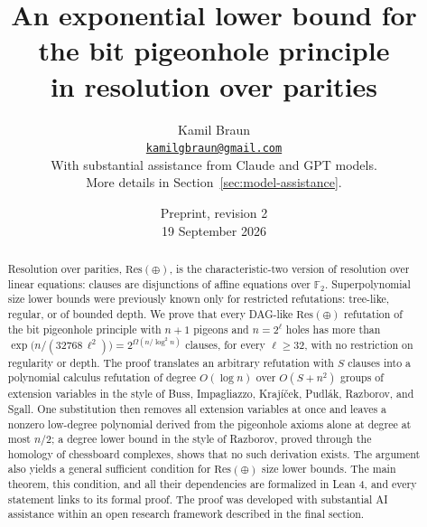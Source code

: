 \documentclass[11pt]{article}
\title{An exponential lower bound for the bit pigeonhole principle\\
in resolution over parities}
\author{Kamil Braun\\
\href{mailto:kamilgbraun@gmail.com}{\texttt{kamilgbraun@gmail.com}}\\[0.6em]
\small With substantial assistance from Claude and GPT models.\\
\small More details in Section~\ref{sec:model-assistance}.}
\date{Preprint, revision 2\\19 September 2026}
\theoremstyle{definition}
\theoremstyle{remark}
\numberwithin{equation}{section}
\begin{document}
\maketitle
\begin{abstract}
Resolution over parities, \(\mathrm{Res}(\oplus)\), is the characteristic-two
version of resolution over linear equations: clauses are disjunctions of
affine equations over \(\mathbb F_2\).
Superpolynomial size lower bounds were previously known only for restricted
refutations: tree-like, regular, or of bounded depth. We prove that every
DAG-like \(\mathrm{Res}(\oplus)\) refutation of the bit pigeonhole principle
with \(n+1\) pigeons and \(n=2^\ell\) holes has more than
\(\exp\bigl(n/(32768\,\ell^2)\bigr)=2^{\Omega(n/\log^2 n)}\) clauses, for every
\(\ell\ge32\), with no restriction on regularity or depth.
The proof translates an arbitrary refutation with \(S\) clauses into a
polynomial calculus refutation of degree \(O(\log n)\) over \(O(S+n^2)\)
groups of extension variables in the style of Buss, Impagliazzo,
Kraj\'i\v{c}ek, Pudl\'ak, Razborov, and Sgall. One substitution then removes
all extension variables at once and leaves a nonzero low-degree polynomial
derived from the pigeonhole axioms alone at degree at most \(n/2\); a degree lower
bound in the style of Razborov, proved through the homology of chessboard
complexes, shows that no such derivation exists.
The argument also yields a general sufficient condition for
\(\mathrm{Res}(\oplus)\) size lower bounds. The main theorem, this condition,
and all their dependencies are formalized in Lean 4, and every statement links
to its formal proof.
The proof was developed with substantial AI assistance within an open
research framework described in the final section.
\end{abstract}
\clearpage
\begingroup\small\tableofcontents\endgroup
\newpage








\appendix



\end{document}
